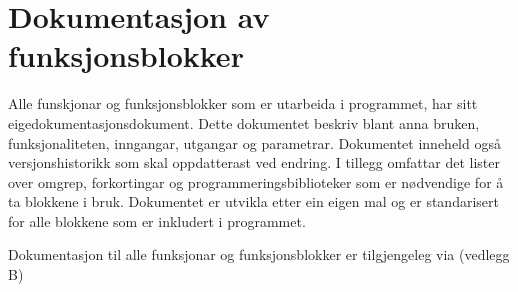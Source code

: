 \section{Dokumentasjon av funksjonsblokker}
\thispagestyle{fancy}

Alle funskjonar og funksjonsblokker som er utarbeida i programmet, har sitt eige\newline dokumentasjonsdokument.
Dette dokumentet beskriv blant anna bruken, funksjonaliteten, inngangar, utgangar og parametrar.
Dokumentet inneheld også versjonshistorikk som skal oppdatterast ved endring. I tillegg omfattar det lister over omgrep, forkortingar og 
programmeringsbiblioteker som er nødvendige for å ta blokkene i bruk.
Dokumentet er utvikla etter ein eigen mal og er standarisert for alle blokkene som er inkludert i programmet.

Dokumentasjon til alle funksjonar og funksjonsblokker er tilgjengeleg via (vedlegg B)